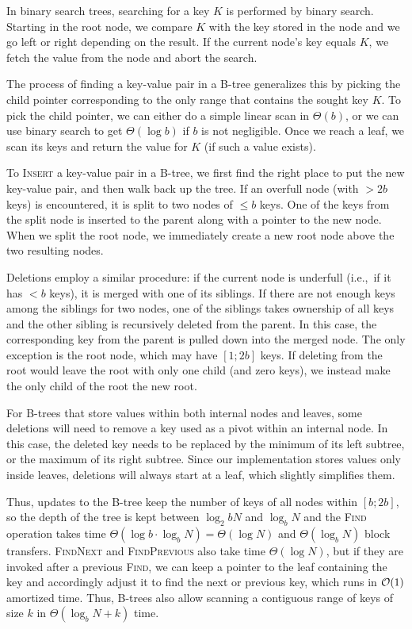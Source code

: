 In binary search trees, searching for a key $K$ is performed by binary search.
Starting in the root node, we compare $K$ with the key stored in the node
and we go left or right depending on the result. If the current node's key
equals $K$, we fetch the value from the node and abort the search.

The process of finding a key-value pair in a B-tree generalizes this
by picking the child pointer corresponding to the only range that contains
the sought key $K$. To pick the child pointer, we can either do a simple
linear scan in $\Theta(b)$, or we can use binary search to get
$\Theta(\log b)$ if $b$ is not negligible.
Once we reach a leaf, we scan its keys and return the value for $K$
(if such a value exists).

To \textsc{Insert} a key-value pair in a B-tree, we first find the right
place to put the new key-value pair, and then walk back up the tree.
If an overfull node (with $> 2b$ keys) is encountered, it is split
to two nodes of $\leq b$ keys. One of the keys from the split node
is inserted to the parent along with a pointer to the new node.
When we split the root node, we immediately create a new root node above the
two resulting nodes.

Deletions employ a similar procedure: if the current node is underfull
(i.e.,\ if it has $< b$ keys), it is merged with one of its siblings.
If there are not enough keys among the siblings for two nodes,
one of the siblings takes ownership of all keys and the other sibling
is recursively deleted from the parent. In this case, the corresponding
key from the parent is pulled down into the merged node.
The only exception is the root node, which may have $[1;2b]$ keys.
If deleting from the root would leave the root with only one child
(and zero keys), we instead make the only child of the root the new root.

For B-trees that store values within both internal nodes and leaves,
some deletions will need to remove a key used as a pivot within an internal
node. In this case, the deleted key needs to be replaced by the minimum of its
left subtree, or the maximum of its right subtree.
Since our implementation stores values only inside leaves, deletions will
always start at a leaf, which slightly simplifies them.

Thus, updates to the B-tree keep the number of keys of all nodes within
$[b;2b]$, so the depth of the tree is kept between $\log_2b N$ and $\log_b N$
and the \textsc{Find} operation takes time
$\Theta(\log b \cdot \log_b N)=\Theta(\log N)$ and $\Theta(\log_b N)$
block transfers. \textsc{FindNext} and \textsc{FindPrevious} also take time
$\Theta(\log N)$, but if they are invoked after a previous \textsc{Find}, we
can keep a pointer to the leaf containing the key and accordingly adjust it to
find the next or previous key, which runs in $\mathcal{O}(1)$ amortized time. Thus,
B-trees also allow scanning a contiguous range of keys of size $k$ in
$\Theta(\log_b N + k)$ time.


